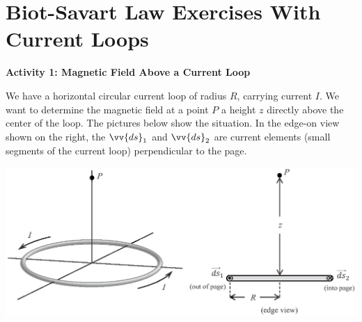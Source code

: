 \section{Biot-Savart Law Exercises With Current Loops}

\makelabheader %

\bigskip

\textbf{Activity 1: Magnetic Field Above a Current Loop}

We have a horizontal 
circular current loop of radius $R$, carrying
current $I$.  We want to determine the magnetic field at a point $P$ a
height $z$ directly above the center of the loop.
The pictures below show the situation.  In the edge-on view shown on the right, 
the $\vv{ds}_1$ and $\vv{ds}_2$ are current elements (small segments of the current loop) perpendicular
to the page.

\vskip 0.4in
\begin{center}
\includegraphics{biot_savart_above_loops/circular_loop_3d.eps}
\end{center}

